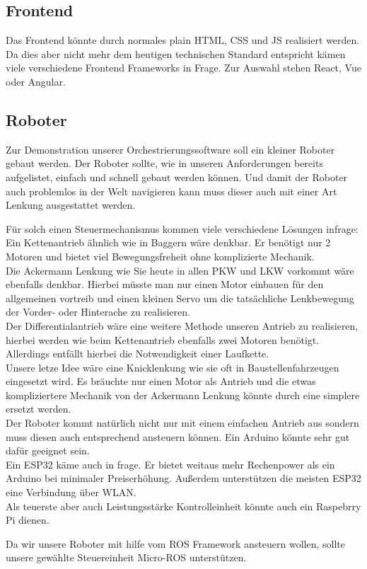 \subsection{Frontend}
    Das Frontend könnte durch normales plain HTML, CSS und JS realisiert werden. 
    Da dies aber nicht mehr dem heutigen technischen Standard entspricht kämen viele verschiedene Frontend Frameworks in Frage.
    Zur Auswahl stehen React, Vue oder Angular.

\subsection{Roboter}
    Zur Demonstration unserer Orchestrierungssoftware soll ein kleiner Roboter gebaut werden.
    Der Roboter sollte, wie in unseren Anforderungen bereits aufgelistet, einfach und schnell gebaut werden können.
    Und damit der Roboter auch problemlos in der Welt navigieren kann muss dieser auch mit einer Art Lenkung ausgestattet werden.

    Für solch einen Steuermechanismus kommen viele verschiedene Lösungen infrage:
    \\
    Ein Kettenantrieb ähnlich wie in Baggern wäre denkbar. Er benötigt nur 2 Motoren und bietet viel Bewegungsfreheit ohne komplizierte Mechanik. 
    \\
    Die Ackermann Lenkung wie Sie heute in allen PKW und LKW vorkommt wäre ebenfalls denkbar. Hierbei müsste man 
    nur einen Motor einbauen für den allgemeinen vortreib und einen kleinen Servo um die tatsächliche Lenkbewegung der
    Vorder- oder Hinterache zu realisieren. 
    \\
    Der Differentialantrieb wäre eine weitere Methode unseren Antrieb zu realisieren, hierbei werden wie beim Kettenantrieb
    ebenfalls zwei Motoren benötigt. Allerdings entfällt hierbei die Notwendigkeit einer Laufkette.
    \\
    Unsere letze Idee wäre eine Knicklenkung wie sie oft in Baustellenfahrzeugen eingesetzt wird. Es bräuchte nur einen Motor
    als Antrieb und die etwas kompliziertere Mechanik von der Ackermann Lenkung könnte durch eine simplere ersetzt werden.
    \\

    Der Roboter kommt natürlich nicht nur mit einem einfachen Antrieb aus sondern muss diesen auch entsprechend 
    ansteuern können.
    Ein Arduino könnte sehr gut dafür geeignet sein.
    \\
    Ein ESP32 käme auch in frage. Er bietet weitaus mehr Rechenpower als ein Arduino bei minimaler Preiserhöhung.
    Außerdem unterstützen die meisten ESP32 eine Verbindung über WLAN.
    \\
    Als teuerste aber auch Leistungsstärke Kontrolleinheit könnte auch ein Raspebrry Pi dienen.
    
    Da wir unsere Roboter mit hilfe vom ROS Framework ansteuern wollen, sollte unsere gewählte Steuereinheit Micro-ROS unterstützen.